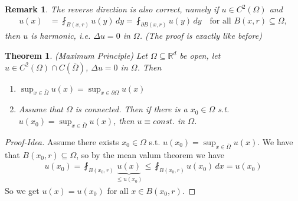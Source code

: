 \documentclass{report}
\theoremstyle{tommy}
\newtheorem{thm}[defn]{Theorem}
\newtheorem{rem}[defn]{Remark}
\begin{document}
\begin{rem}
  The reverse direction is also correct, namely if \(u \in C^2(\Omega)\) and
  \begin{align*}
    u(x) 
    &= \fint_{B(x, r)} u(y) \, dy
    = \fint_{\partial B(x,r)} u(y) \, dy
    \quad \text{for all } B(x,r) \subseteq \Omega,
  \end{align*}
  then \(u\) is harmonic, i.e. \(\Delta u = 0\) in \(\Omega\). (The proof is exactly like before)
\end{rem}

\begin{thm} (Maximum Principle)
  Let \(\Omega \subseteq \mathbb{R}^d\) be open, let \(u \in C^2(\Omega) \cap C(\bar \Omega)\), \(\Delta u = 0\) in \(\Omega\). Then
  \begin{enumerate}[label=\alph*)]
    \item \(\sup_{x \in \bar \Omega} u(x) = \sup_{x \in \partial \Omega} u(x)\)
    \item Assume that \(\Omega\) is connected. Then if there is a \(x_0 \in \Omega\) s.t. \( u(x_0) = \sup_{x \in \bar \Omega} u(x)\), then \( u \equiv const.\) in \(\Omega\).
  \end{enumerate}
\end{thm}

\begin{proof}[Proof-Idea]
  Assume there exists \(x_0 \in \Omega\) s.t. \(u(x_0) = \sup_{x \in \bar \Omega} u(x)\). We have that \(B(x_0, r) \subseteq \Omega\), so by the mean valum theorem we have
  \begin{align*}
    u(x_0) 
    = \fint_{B(x_0, r)} \underbrace{u(x)}_{\le u(x_0)}
    \le \fint_{B(x_0, r)} u(x_0) \, dx = u(x_0)
  \end{align*}
  So we get \(u(x) = u(x_0)\) for all \(x \in B(x_0, r)\).
\end{proof}
\end{document}
